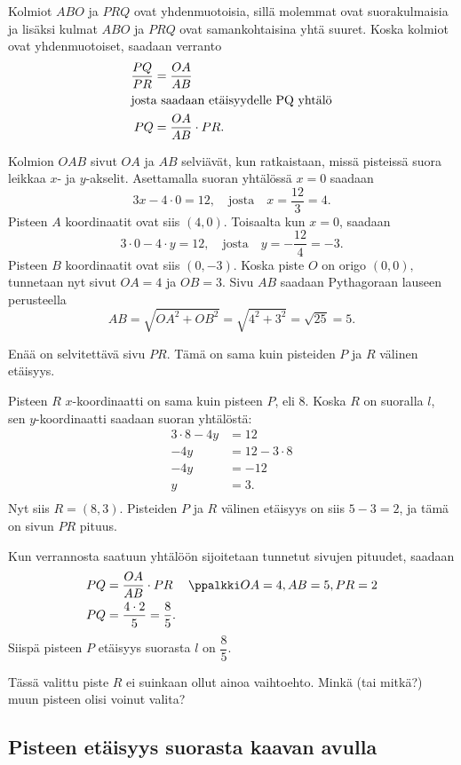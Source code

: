 Kolmiot $ABO$ ja $PRQ$ ovat yhdenmuotoisia, sillä molemmat ovat suorakulmaisia ja lisäksi kulmat $ABO$ ja $PRQ$ ovat samankohtaisina yhtä suuret. Koska kolmiot ovat yhdenmuotoiset, saadaan verranto
\begin{align*}
\frac{PQ}{PR} &=\frac{OA}{AB}\\
\intertext{josta saadaan etäisyydelle PQ yhtälö}
PQ &=\frac{OA}{AB}\cdot PR.
\end{align*}

Kolmion $OAB$ sivut $OA$ ja $AB$ selviävät, kun ratkaistaan, missä pisteissä suora leikkaa $x$- ja $y$-akselit.
Asettamalla suoran yhtälössä $x=0$ saadaan
\[
3x-4\cdot 0=12, \quad \text{josta} \quad x=\frac{12}{3}=4.
\]
Pisteen $A$ koordinaatit ovat siis $(4, 0)$. Toisaalta kun $x=0$, saadaan
\[
3\cdot 0-4\cdot y=12, \quad \text{josta} \quad y=-\frac{12}{4}=-3.
\]
Pisteen $B$ koordinaatit ovat siis $(0, -3)$. Koska piste $O$ on origo $(0,0),$ tunnetaan nyt sivut $OA=4$ ja $OB=3$. Sivu $AB$ saadaan Pythagoraan lauseen perusteella
\[
AB=\sqrt{OA^2+OB^2}=\sqrt{4^2+3^2}=\sqrt{25}=5.
\]

Enää on selvitettävä sivu $PR$. Tämä on sama kuin pisteiden $P$ ja $R$ välinen etäisyys.

Pisteen $R$ $x$-koordinaatti on sama kuin pisteen $P$, eli 8. Koska $R$ on suoralla $l$, sen $y$-koordinaatti saadaan suoran yhtälöstä:
\begin{align*}
3\cdot 8-4y & =12 \\
-4y & =12-3\cdot 8 \\
-4y & =-12 \\
y & =3. \\
\end{align*}
Nyt siis $R=(8, 3)$. Pisteiden $P$ ja $R$ välinen etäisyys on siis $5-3=2$, ja tämä on sivun $PR$ pituus.

Kun verrannosta saatuun yhtälöön sijoitetaan tunnetut sivujen pituudet, saadaan
\begin{align*}
PQ &=\frac{OA}{AB}\cdot PR  && \ppalkki OA= 4, AB=5, PR= 2\\
PQ & =\frac{4\cdot 2}{5} = \frac{8}{5}.
\end{align*}
Siispä pisteen $P$ etäisyys suorasta $l$ on $\dfrac{8}{5}$.

Tässä valittu piste $R$ ei suinkaan ollut ainoa vaihtoehto. Minkä (tai mitkä?) muun pisteen olisi voinut valita?

\subsection*{Pisteen etäisyys suorasta kaavan avulla}

